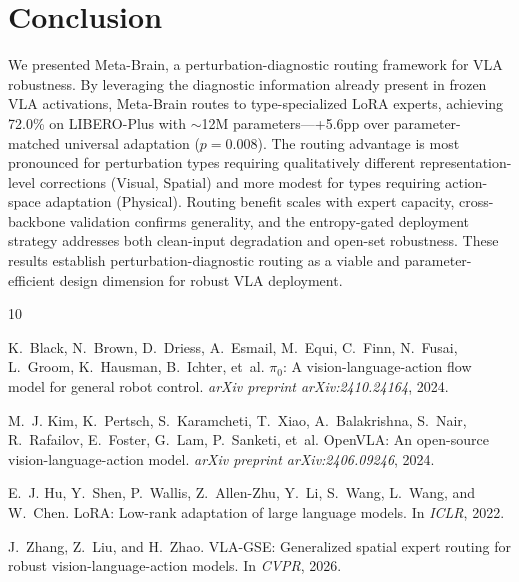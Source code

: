 \documentclass[10pt,twocolumn]{article}
\begin{document}
\section{Conclusion}
\label{sec:conclusion}

We presented Meta-Brain, a perturbation-diagnostic routing framework for VLA robustness.
By leveraging the diagnostic information already present in frozen VLA activations, Meta-Brain routes to type-specialized LoRA experts, achieving 72.0\% on LIBERO-Plus with ${\sim}$12M parameters---+5.6pp over parameter-matched universal adaptation ($p{=}0.008$).
The routing advantage is most pronounced for perturbation types requiring qualitatively different representation-level corrections (Visual, Spatial) and more modest for types requiring action-space adaptation (Physical).
Routing benefit scales with expert capacity, cross-backbone validation confirms generality, and the entropy-gated deployment strategy addresses both clean-input degradation and open-set robustness.
These results establish perturbation-diagnostic routing as a viable and parameter-efficient design dimension for robust VLA deployment.



\begin{thebibliography}{10}

K.~Black, N.~Brown, D.~Driess, A.~Esmail, M.~Equi, C.~Finn, N.~Fusai, L.~Groom, K.~Hausman, B.~Ichter, et~al.
\newblock $\pi_0$: A vision-language-action flow model for general robot control.
\newblock \emph{arXiv preprint arXiv:2410.24164}, 2024.

M.~J. Kim, K.~Pertsch, S.~Karamcheti, T.~Xiao, A.~Balakrishna, S.~Nair, R.~Rafailov, E.~Foster, G.~Lam, P.~Sanketi, et~al.
\newblock OpenVLA: An open-source vision-language-action model.
\newblock \emph{arXiv preprint arXiv:2406.09246}, 2024.

E.~J. Hu, Y.~Shen, P.~Wallis, Z.~Allen-Zhu, Y.~Li, S.~Wang, L.~Wang, and W.~Chen.
\newblock LoRA: Low-rank adaptation of large language models.
\newblock In \emph{ICLR}, 2022.

J.~Zhang, Z.~Liu, and H.~Zhao.
\newblock VLA-GSE: Generalized spatial expert routing for robust vision-language-action models.
\newblock In \emph{CVPR}, 2026.

\end{thebibliography}
\end{document}
